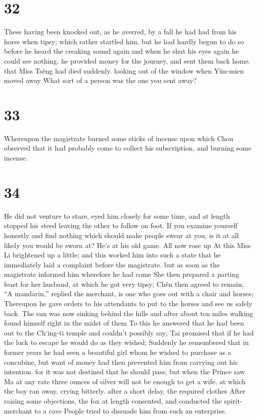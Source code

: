\documentclass[11pt,a5paper]{book}
\begin{document}
\chapter*{\normalfont\Large 32}
These having been knocked out, as he averred, by a fall he had had from his horse when tipsy; which rather startled him. but he had hardly begun to do so before he heard the creaking sound again and when he shut his eyes again he could see nothing. he provided money for the journey, and sent them back home. that Miss Tsêng had died suddenly. looking out of the window when Yün-mien moved away What sort of a person was the one you sent away?
\clearpage

\chapter*{\normalfont\Large 33}
Whereupon the magistrate burned some sticks of incense upon which Chou observed that it had probably come to collect his subscription, and burning some incense.
\clearpage

\chapter*{\normalfont\Large 34}
He did not venture to stare, eyed him closely for some time, and at length stopped his steed leaving the other to follow on foot. If you examine yourself honestly and find nothing which should make people swear at you, is it at all likely you would be sworn at? He’s at his old game. All now rose up At this Miss Li brightened up a little; and this worked him into such a state that he immediately laid a complaint before the magistrate. but as soon as the magistrate informed him wherefore he had come She then prepared a parting feast for her husband, at which he got very tipsy; Chên then agreed to remain; “A mandarin,” replied the merchant, is one who goes out with a chair and horses; Thereupon he gave orders to his attendants to put to the horses and see us safely back. The sun was now sinking behind the hills and after about ten miles walking found himself right in the midst of them To this he answered that he had been out to the Ch‘ing-ti temple and couldn’t possibly say; Tai promised that if he had the luck to escape he would do as they wished; Suddenly he remembered that in former years he had seen a beautiful girl whom he wished to purchase as a concubine, but want of money had then prevented him from carrying out his intention. for it was not destined that he should pass; but when the Prince saw Ma at any rate three ounces of silver will not be enough to get a wife. at which the boy ran away, crying bitterly. after a short delay, the required clothes After raising some objections, the fox at length consented, and conducted the spirit-merchant to a cave People tried to dissuade him from such an enterprise.
\clearpage
\end{document}
